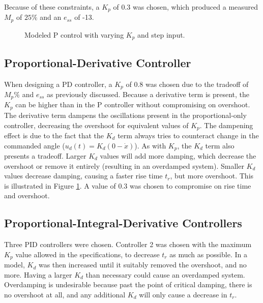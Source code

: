 \documentclass[12pt]{article}
\begin{document}
Because of these constraints, a $K_p$ of 0.3 was chosen, which produced a measured $M_p$ of $25\%$ and an $e_{ss}$ of -13\degree.
\begin{figure}[H]
\centering
\begin{minipage}{.5\textwidth}
    \centering
    \captionsetup{justification=centering, margin=0.5cm}
    \scalebox{0.55}{}
    \caption{Modeled P control with varying $K_p$ and step input.}
    \label{fig:pcontroller}
\end{minipage}%
\begin{minipage}{.5\textwidth}
    \centering
    \captionsetup{justification=centering, margin=0.5cm}
    \scalebox{0.55}{}
    \label{fig:pdcontroller}
\end{minipage}
\end{figure}

\subsection{Proportional-Derivative Controller}
When designing a PD controller, a $K_p$ of 0.8 was chosen due to the tradeoff of $M_p\%$ and $e_{ss}$ as previously discussed. Because a derivative term is present, the $K_p$ can be higher than
in the P controller without compromising on overshoot. The derivative term dampens the oscillations present in the proportional-only controller, decreasing the overshoot for
equivalent values of $K_p$. The dampening effect is due to the fact that the $K_d$ term always tries to counteract change in the commanded angle ($u_d(t) = K_d(0-\dot{x})$). As with $K_p$, the $K_d$ term also presents a tradeoff. Larger $K_d$ values will add more damping, which decrease the overshoot or remove it entirely
(resulting in an overdamped system). Smaller $K_d$ values decrease damping, causing a faster rise time $t_r$, but more overshoot. This is illustrated in Figure \ref{fig:pdcontroller}.
A value of 0.3 was chosen to compromise on rise time and overshoot.



\subsection{Proportional-Integral-Derivative Controllers}
Three PID controllers were chosen. Controller 2 was chosen with the maximum $K_p$ value allowed in the specifications, to decrease $t_r$ as much as possible.
In a model, $K_d$ was then increased until it suitably removed the overshoot, and no more. Having a larger $K_d$ than necessary could cause an overdamped system.
Overdamping is undesirable because past the point of critical damping, there is no overshoot at all, and any additional $K_d$ will only cause a decrease in $t_r$.
\end{document}
